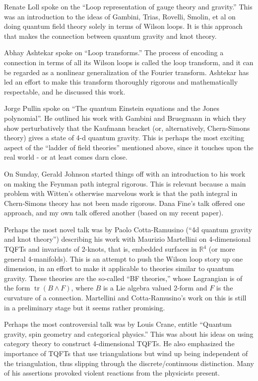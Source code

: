 \documentclass{article}
\begin{document}
Renate Loll spoke on the ``Loop representation of gauge theory and
gravity.'' This was an introduction to the ideas of Gambini, Trias,
Rovelli, Smolin, et al on doing quantum field theory solely in terms of
Wilson loops. It is this approach that makes the connection between
quantum gravity and knot theory.

Abhay Ashtekar spoke on ``Loop transforms.'' The process of encoding a
connection in terms of all its Wilson loops is called the loop
transform, and it can be regarded as a nonlinear generalization of the
Fourier transform. Ashtekar has led an effort to make this transform
thoroughly rigorous and mathematically respectable, and he discussed
this work.

Jorge Pullin spoke on ``The quantum Einstein equations and the Jones
polynomial''. He outlined his work with Gambini and Bruegmann in which
they show perturbatively that the Kaufmann bracket (or, alternatively,
Chern-Simons theory) gives a state of 4-d quantum gravity. This is
perhaps the most exciting aspect of the ``ladder of field theories''
mentioned above, since it touches upon the real world - or at least
comes darn close.

On Sunday, Gerald Johnson started things off with an introduction to his
work on making the Feynman path integral rigorous. This is relevant
because a main problem with Witten's otherwise marvelous work is that
the path integral in Chern-Simons theory has not been made rigorous.
Dana Fine's talk offered one approach, and my own talk offered another
(based on my recent paper).

Perhaps the most novel talk was by Paolo Cotta-Ramusino (``4d quantum
gravity and knot theory'') describing his work with Maurizio Martellini
on 4-dimensional TQFTs and invariants of 2-knots, that is, embedded
surfaces in \(\mathbb{R}^4\) (or more general 4-manifolds). This is an
attempt to push the Wilson loop story up one dimension, in an effort to
make it applicable to theories similar to quantum gravity. These
theories are the so-called ``BF theories,'' whose Lagrangian is of the
form \(\operatorname{tr}(B \wedge F)\), where \(B\) is a Lie algebra
valued 2-form and \(F\) is the curvature of a connection. Martellini and
Cotta-Ramusino's work on this is still in a preliminary stage but it
seems rather promising.

Perhaps the most controversial talk was by Louis Crane, entitle
``Quantum gravity, spin geometry and categorical physics.'' This was
about his ideas on using category theory to construct 4-dimensional
TQFTs. He also emphasized the importance of TQFTs that use
triangulations but wind up being independent of the triangulation, thus
slipping through the discrete/continuous distinction. Many of his
assertions provoked violent reactions from the physicists present.
\end{document}
